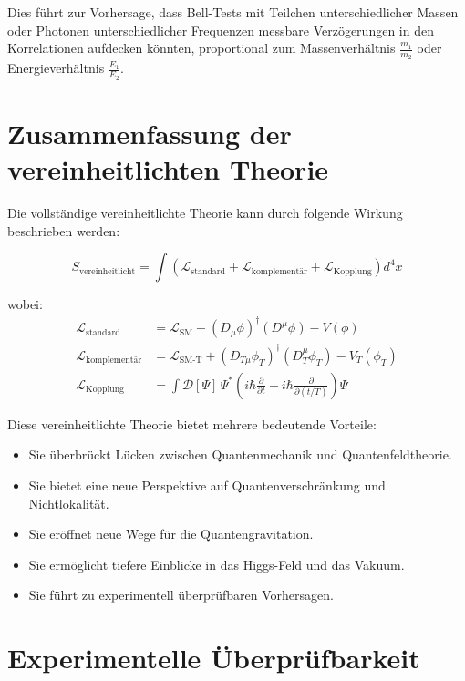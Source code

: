\documentclass{article}
\begin{document}
	Dies führt zur Vorhersage, dass Bell-Tests mit Teilchen unterschiedlicher Massen oder Photonen unterschiedlicher Frequenzen messbare Verzögerungen in den Korrelationen aufdecken könnten, proportional zum Massenverhältnis $\frac{m_1}{m_2}$ oder Energieverhältnis $\frac{E_1}{E_2}$.
	
	\section{Zusammenfassung der vereinheitlichten Theorie}
	
	Die vollständige vereinheitlichte Theorie kann durch folgende Wirkung beschrieben werden:
	
	\begin{equation}
		S_\text{vereinheitlicht} = \int \left( \mathcal{L}_\text{standard} + \mathcal{L}_\text{komplementär} + \mathcal{L}_\text{Kopplung} \right) d^4x
	\end{equation}
	
	wobei:
	\begin{align}
		\mathcal{L}_\text{standard} &= \mathcal{L}_\text{SM} + (D_\mu \phi)^\dagger (D^\mu \phi) - V(\phi) \\
		\mathcal{L}_\text{komplementär} &= \mathcal{L}_\text{SM-T} + (D_{T\mu} \phi_T)^\dagger (D_T^\mu \phi_T) - V_T(\phi_T) \\
		\mathcal{L}_\text{Kopplung} &= \int \mathcal{D}[\Psi] \, \Psi^* \left( i\hbar \frac{\partial}{\partial t} - i\hbar \frac{\partial}{\partial (t/T)} \right) \Psi
	\end{align}
	
	Diese vereinheitlichte Theorie bietet mehrere bedeutende Vorteile:
	\begin{itemize}
		\item Sie überbrückt Lücken zwischen Quantenmechanik und Quantenfeldtheorie.
		\item Sie bietet eine neue Perspektive auf Quantenverschränkung und Nichtlokalität.
		\item Sie eröffnet neue Wege für die Quantengravitation.
		\item Sie ermöglicht tiefere Einblicke in das Higgs-Feld und das Vakuum.
		\item Sie führt zu experimentell überprüfbaren Vorhersagen.
	\end{itemize}
	
	\section{Experimentelle Überprüfbarkeit}
	
\end{document}
